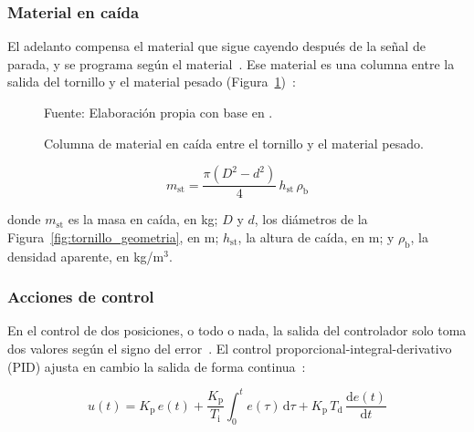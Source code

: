 \subsubsection{Material en caída}
\label{subsubsec:fund_caida}

El adelanto compensa el material que sigue cayendo después de la señal de
parada, y se programa según el material~\parencite{bulatov2021dosing}. Ese material
es una columna entre la salida del tornillo y el material pesado
(Figura~\ref{fig:columna_caida})~\parencite{bukreev2014accuracy}:

\begin{figure}[H]
    \centering
    \resizebox{0.42\textwidth}{!}{}
    \caption{Columna de material en caída entre el tornillo y el material pesado.}
    \label{fig:columna_caida}
    \vspace{0.2em}
    {\footnotesize Fuente: Elaboración propia con base en
    \textcite{bukreev2014accuracy}.}
\end{figure}

\begin{equation}
    m_{\mathrm{st}} = \frac{\pi \left(D^{2} - d^{2}\right)}{4}\, h_{\mathrm{st}}\, \rho_{\mathrm{b}}
    \label{eq:columna_caida}
\end{equation}

\noindent donde $m_{\mathrm{st}}$ es la masa en caída, en kg; $D$ y $d$, los
diámetros de la Figura~\ref{fig:tornillo_geometria}, en m;
$h_{\mathrm{st}}$, la altura de caída, en m; y $\rho_{\mathrm{b}}$, la
densidad aparente, en kg/m$^{3}$.

\subsubsection{Acciones de control}
\label{subsubsec:fund_acciones}

En el control de dos posiciones, o todo o nada, la salida del controlador solo toma
dos valores según el signo del error~\parencite{ogata2010control}. El control
proporcional-integral-derivativo (PID) ajusta en cambio la salida de forma
continua~\parencite{ogata2010control}:

\begin{equation}
    u(t) = K_{\mathrm{p}}\, e(t)
    + \frac{K_{\mathrm{p}}}{T_{\mathrm{i}}} \int_{0}^{t} e(\tau)\, \mathrm{d}\tau
    + K_{\mathrm{p}}\, T_{\mathrm{d}}\, \frac{\mathrm{d}e(t)}{\mathrm{d}t}
    \label{eq:pid}
\end{equation}

